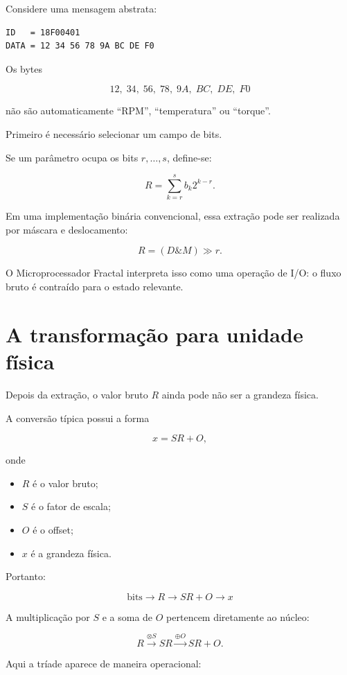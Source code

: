 \documentclass[11pt,a4paper]{article}
\begin{document}
Considere uma mensagem abstrata:

\begin{lstlisting}
ID   = 18F00401
DATA = 12 34 56 78 9A BC DE F0
\end{lstlisting}

Os bytes

\[
12,\;34,\;56,\;78,\;9A,\;BC,\;DE,\;F0
\]

não são automaticamente ``RPM'', ``temperatura'' ou ``torque''.

Primeiro é necessário selecionar um campo de bits.

Se um parâmetro ocupa os bits $r,\ldots,s$, define-se:

\[
R =
\sum_{k=r}^{s}
b_k2^{k-r}.
\]

Em uma implementação binária convencional, essa extração pode ser realizada por
máscara e deslocamento:

\[
R=(D\mathbin{\&}M)\gg r.
\]

O Microprocessador Fractal interpreta isso como uma operação de I/O: o fluxo bruto
é contraído para o estado relevante.


\section{A transformação para unidade física}

Depois da extração, o valor bruto $R$ ainda pode não ser a grandeza física.

A conversão típica possui a forma

\[
x=S R+O,
\]

onde

\begin{itemize}
\item $R$ é o valor bruto;
\item $S$ é o fator de escala;
\item $O$ é o offset;
\item $x$ é a grandeza física.
\end{itemize}

Portanto:

\[
\boxed{
\text{bits}
\rightarrow
R
\rightarrow
SR+O
\rightarrow
x
}
\]

A multiplicação por $S$ e a soma de $O$ pertencem diretamente ao núcleo:

\[
R
\xrightarrow{\otimes S}
SR
\xrightarrow{\oplus O}
SR+O.
\]

Aqui a tríade aparece de maneira operacional:
\end{document}
